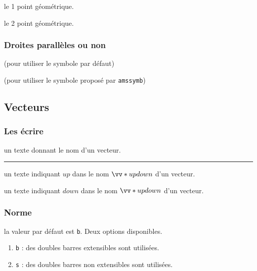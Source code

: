 \documentclass[12pt,a4paper]{article}
\theoremstyle{definition}
\newcommand\separation{
	\medskip
	\hfill\rule{0.5\textwidth}{0.75pt}\hfill
	\medskip
}
\newcommand\extraspace{
	\vspace{0.25em}
}
\begin{document}

 le 1\ier{} point géométrique.

 le 2\ieme{} point géométrique.




\subsubsection{Droites parallèles ou non}





\extraspace

 (pour utiliser le symbole par défaut)

 (pour utiliser le symbole proposé par \verb+amssymb+)


\subsection{Vecteurs}

\subsubsection{Les écrire}




\IDarg{} un texte donnant le nom d'un vecteur.


\separation



 un texte indiquant $up$ dans le nom $\vect*{up}{down}$ d'un vecteur.

 un texte indiquant $down$ dans le nom $\vect*{up}{down}$ d'un vecteur.


\subsubsection{Norme}




\IDoption{} la valeur par défaut est \verb+b+. Deux options disponibles.
\begin{enumerate}
	\item \verb+b+ : des doubles barres extensibles sont utilisées.

	\item \verb+s+ : des doubles barres non extensibles sont utilisées.
\end{enumerate}
\end{document}
